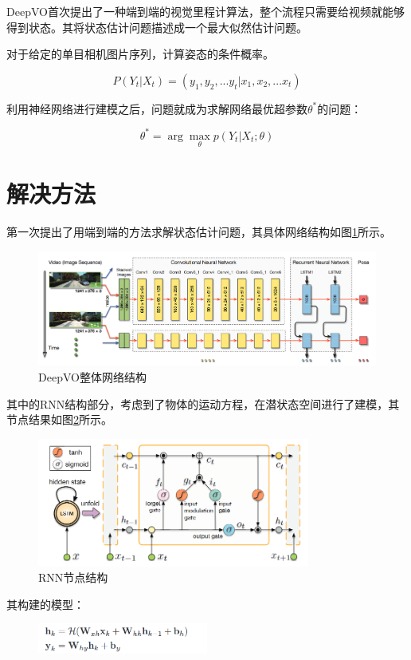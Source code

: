 DeepVO首次提出了一种端到端的视觉里程计算法，整个流程只需要给视频就能够得到状态。其将状态估计问题描述成一个最大似然估计问题。

\begin{tcolorbox}[]
	对于给定的单目相机图片序列，计算姿态的条件概率。
	
	$$P(Y_t|X_t) = (y_1,y_2,...y_t|x_1,x_2,...x_t)$$
	
	利用神经网络进行建模之后，问题就成为求解网络最优超参数$\theta^*$的问题：
	
	$$\theta^{*} = \arg\max_{\theta} p(Y_{t}|X_{t}; \theta)$$
\end{tcolorbox}

\section{解决方法}
第一次提出了用端到端的方法求解状态估计问题，其具体网络结构如图\ref{deepvo1}所示。

\begin{figure}[H]
	\centering
	\includegraphics[width=\textwidth]{images/deepvo1.png}
	\caption{DeepVO整体网络结构}
	\label{deepvo1}
\end{figure}

其中的RNN结构部分，考虑到了物体的运动方程，在潜状态空间进行了建模，其节点结果如图\ref{rnn_point}所示。
\begin{figure}[H]
	\centering
	\includegraphics[width=0.8\textwidth]{images/deepvo/rnn_point.png}
	\caption{RNN节点结构}
	\label{rnn_point}
\end{figure}

其构建的模型：
\begin{figure}[H]
	\centering
	\includegraphics[width=0.5\textwidth]{images/deepvo/fuc1.png}
\end{figure}

